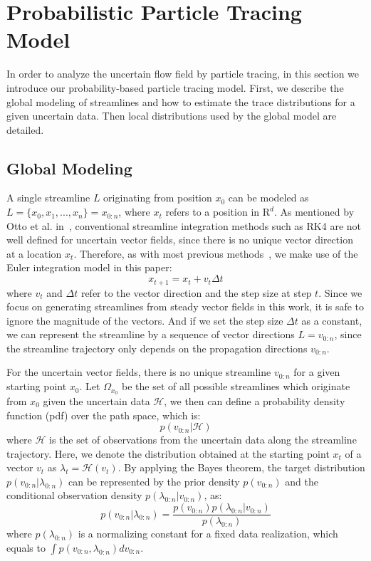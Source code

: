 \section{Probabilistic Particle Tracing Model}

In order to analyze the uncertain flow field by particle tracing, in this section we introduce our probability-based particle tracing model. First, we describe the global modeling of streamlines and how to estimate the trace distributions for a given uncertain data. Then local distributions used by the global model are detailed.

\subsection{Global Modeling}

A single streamline $L$ originating from position ${x_0}$ can be modeled as $L = \{ {x_0},{x_1},...,{x_n}\} = {x_{0:n}}$, where $x_t$ refers to a position in $\mathrm{R}^d$. As mentioned by Otto et al. in~\cite{Otto10a, Otto11a}, conventional streamline integration methods such as RK4 are not well defined for uncertain vector fields, since there is no unique vector direction at a location ${x_t}$. Therefore, as with most previous methods~\cite{Otto10a, Otto11a}, we make use of the Euler integration model in this paper:
\begin{equation}
  {x_{t + 1}} = {x_t} + {v_t}\Delta t
\end{equation}
where ${v_t}$ and $\Delta t$ refer to the vector direction and the step size at step $t$. Since we focus on generating streamlines from steady vector fields in this work, it is safe to ignore the magnitude of the vectors. And if we set the step size $\Delta t$ as a constant, we can represent the streamline by a sequence of vector directions ${L = v_{0:n}}$, since the streamline trajectory only depends on the propagation directions $v_{0:n}$.

For the uncertain vector fields, there is no unique streamline $v_{0:n}$ for a given starting point $x_0$. Let $\Omega_{x_0}$ be the set of all possible streamlines which originate from $x_0$ given the uncertain data $\mathcal{H}$, we then can define a probability density function (pdf) over the path space, which is:
\begin{equation}
  p(v_{0:n}|\mathcal{H})
\end{equation}
where $\mathcal{H}$ is the set of observations from the uncertain data along the streamline trajectory. Here, we denote the distribution obtained at the starting point $x_t$ of a vector $v_t$ as $\lambda_t=\mathcal{H}(v_t)$. By applying the Bayes theorem, the target distribution $p({v_{0:n}}|{\lambda_{0:n}})$ can be represented by the prior density $p({v_{0:n}})$ and the conditional observation density $p({\lambda_{0:n}}|{v_{0:n}})$, as:
\begin{equation}
  p({v_{0:n}}|{\lambda_{0:n}}) = \frac{{p({v_{0:n}})p({\lambda_{0:n}}|{v_{0:n}})}}{{p({\lambda_{0:n}})}}
\end{equation}
where ${p({\lambda_{0:n}})}$ is a normalizing constant for a fixed data realization, which equals to $\int {p({v_{0:n}},{\lambda_{0:n}})} d{v_{0:n}}$.

